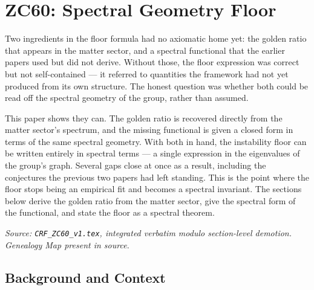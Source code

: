 \documentclass[12pt, a4paper]{article}
\begin{document}

\section{ZC60: Spectral Geometry Floor}

Two ingredients in the floor formula had no axiomatic home yet: the golden ratio
that appears in the matter sector, and a spectral functional that the earlier
papers used but did not derive. Without those, the floor expression was correct
but not self-contained --- it referred to quantities the framework had not yet
produced from its own structure. The honest question was whether both could be
read off the spectral geometry of the group, rather than assumed.

This paper shows they can. The golden ratio is recovered directly from the
matter sector's spectrum, and the missing functional is given a closed form in
terms of the same spectral geometry. With both in hand, the instability floor
can be written entirely in spectral terms --- a single expression in the
eigenvalues of the group's graph. Several gaps close at once as a result,
including the conjectures the previous two papers had left standing. This is the
point where the floor stops being an empirical fit and becomes a spectral
invariant. The sections below derive the golden ratio from the matter sector,
give the spectral form of the functional, and state the floor as a spectral
theorem.
\label{sec:zc60}

\noindent
\textit{Source: \texttt{CRF\_ZC60\_v1.tex}, integrated verbatim modulo
section-level demotion. Genealogy Map present in source.}

\medskip
\subsection{Background and Context}
\label{sec:background}
\end{document}
